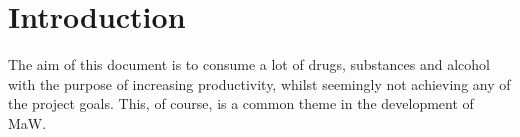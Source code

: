 \section{Introduction}
The aim of this document is to consume a lot of drugs, substances and alcohol with the purpose of
increasing productivity, whilst seemingly not achieving any of the project goals.
This, of course, is a common theme in the development of MaW.
